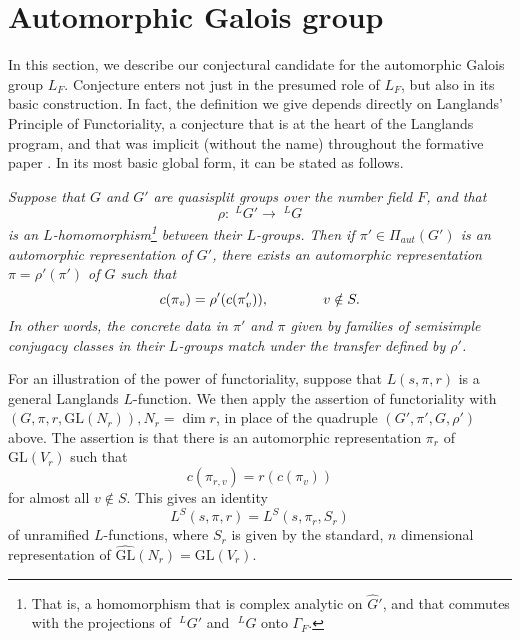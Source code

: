 \documentclass[preprint,12pt, leqno]{elsarticle}
\newcommand{\GL}{\mbox{GL}}
\newcommand{\LG}{\;^LG}
\newcommand{\whG}{\widehat{G}}
\newcommand{\SP}{\mkern70mu }
\numberwithin{equation}{section}
\theoremstyle{named}
\begin{document}
\section{Automorphic Galois group}\label{sec: automorphic galois groups}

In this section, we describe our conjectural candidate for the automorphic Galois group $L_F$. Conjecture enters not just in the presumed role of $L_F$, but also in its basic construction. In fact, the definition we give depends directly on Langlands' Principle of Functoriality, a conjecture that is at the heart of the Langlands program, and that was implicit (without the name) throughout the formative paper \cite{L2}. In its most basic global form, it can be stated as follows.

\begin{description}[leftmargin=0pt]
    \item[Langlands Principle of Functoriality:] \textit{Suppose that $G$ and $G'$ are quasisplit groups over the number field $F$, and that
    \begin{equation*}
        \rho: \LG'\longrightarrow \LG
    \end{equation*}
    is an $L$-homomorphism\footnote{That is, a homomorphism that is complex analytic on $\whG'$, and that commutes with the projections of $\LG'$ and $\LG$ onto $\Gamma_F$.}
    between their $L$-groups. Then if $\pi'\in \Pi_{aut}(G')$ is an automorphic representation of $G'$, there exists an automorphic representation $\pi = \rho'(\pi')$ of $G$ such that
    \begin{equation*}
        c(\pi_v) = \rho'(c(\pi_v')), \SP v\notin S.
    \end{equation*}
    In other words, the concrete data in $\pi'$ and $\pi$ given by families of semisimple conjugacy classes in their $L$-groups match under the transfer defined by $\rho'$.}
\end{description}

For an illustration of the power of functoriality, suppose that $L(s, \pi, r)$ is a general Langlands $L$-function. We then apply the assertion of functoriality with $(G, \pi, r, \GL(N_r)), N_r = \dim r$, in place of the quadruple $(G', \pi', G, \rho')$ above. The assertion is that there is an automorphic representation $\pi_r$ of $\GL(V_r)$ such that
\begin{equation*}
    c(\pi_{r, v}) = r(c(\pi_v))
\end{equation*}
for almost all $v\notin S$. This gives an identity
\begin{equation}\label{eq: 3.1}
    L^S(s, \pi, r) = L^{S}(s, \pi_r, S_r)
\end{equation}
of unramified $L$-functions, where $S_r$ is given by the standard, $n$ dimensional representation of $\widehat{\GL}(N_r) = \GL(V_r)$.
\end{document}

